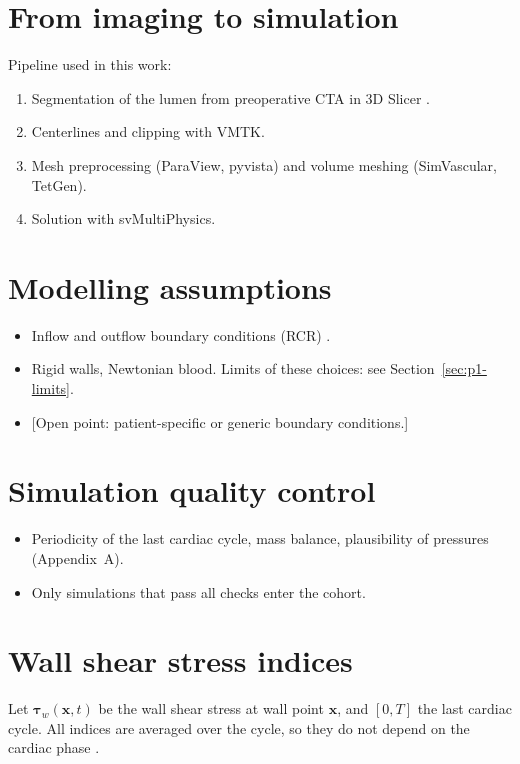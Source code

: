\section{From imaging to simulation}
Pipeline used in this work:
\begin{enumerate}
    \item Segmentation of the lumen from preoperative CTA in 3D Slicer \cite{lasso_slicerheart_2022, trentin_automatic_2015}.
    \item Centerlines and clipping with VMTK. 
    \item Mesh preprocessing (ParaView, pyvista) and volume meshing (SimVascular, TetGen). 
    \item Solution with svMultiPhysics. 
\end{enumerate}

\section{Modelling assumptions}
\begin{itemize}
    \item Inflow and outflow boundary conditions (RCR) \cite{du_outflow_2015, ramazanli_modeling_2025, les_quantification_2010}.
    \item Rigid walls, Newtonian blood. Limits of these choices: see Section~\ref{sec:p1-limits}.
    \item {[}Open point: patient-specific or generic boundary conditions.]
\end{itemize}

\section{Simulation quality control}
\begin{itemize}
    \item Periodicity of the last cardiac cycle, mass balance, plausibility of pressures (Appendix~A).
    \item Only simulations that pass all checks enter the cohort.
\end{itemize}

\section{Wall shear stress indices}
\label{sec:wss-indices}
Let $\boldsymbol{\tau}_w(\mathbf{x},t)$ be the wall shear stress at wall point $\mathbf{x}$, and $[0,T]$ the last cardiac cycle.
All indices are averaged over the cycle, so they do not depend on the cardiac phase
\cite{mutlu_integrated_2026, katsoudas_hemodynamic_2026}.

